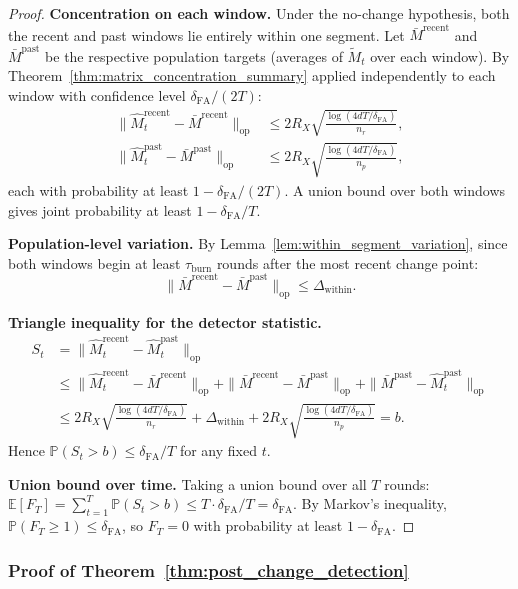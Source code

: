 \documentclass{article}
\newcommand{\E}{\mathbb{E}}
\newcommand{\Prob}{\mathbb{P}}
\newcommand{\op}{\mathrm{op}}
\begin{document}
\begin{proof}
\textbf{Concentration on each window.}
Under the no-change hypothesis, both the recent and past windows lie entirely within one segment.  Let $\bar M^{\mathrm{recent}}$ and $\bar M^{\mathrm{past}}$ be the respective population targets (averages of $\widetilde M_t$ over each window).  By Theorem~\ref{thm:matrix_concentration_summary} applied independently to each window with confidence level $\delta_{\mathrm{FA}}/(2T)$:
\begin{align*}
\|\widehat M_t^{\mathrm{recent}} - \bar M^{\mathrm{recent}}\|_{\op} &\le 2R_X\sqrt{\frac{\log(4dT/\delta_{\mathrm{FA}})}{n_r}}, \\
\|\widehat M_t^{\mathrm{past}} - \bar M^{\mathrm{past}}\|_{\op} &\le 2R_X\sqrt{\frac{\log(4dT/\delta_{\mathrm{FA}})}{n_p}},
\end{align*}
each with probability at least $1 - \delta_{\mathrm{FA}}/(2T)$.  A union bound over both windows gives joint probability at least $1 - \delta_{\mathrm{FA}}/T$.

\textbf{Population-level variation.}
By Lemma~\ref{lem:within_segment_variation}, since both windows begin at least $\tau_{\mathrm{burn}}$ rounds after the most recent change point:
\[
\|\bar M^{\mathrm{recent}} - \bar M^{\mathrm{past}}\|_{\op} \le \Delta_{\mathrm{within}}.
\]

\textbf{Triangle inequality for the detector statistic.}
\begin{align*}
S_t &= \|\widehat M_t^{\mathrm{recent}} - \widehat M_t^{\mathrm{past}}\|_{\op} \\
&\le \|\widehat M_t^{\mathrm{recent}} - \bar M^{\mathrm{recent}}\|_{\op} + \|\bar M^{\mathrm{recent}} - \bar M^{\mathrm{past}}\|_{\op} + \|\bar M^{\mathrm{past}} - \widehat M_t^{\mathrm{past}}\|_{\op} \\
&\le 2R_X\sqrt{\frac{\log(4dT/\delta_{\mathrm{FA}})}{n_r}} + \Delta_{\mathrm{within}} + 2R_X\sqrt{\frac{\log(4dT/\delta_{\mathrm{FA}})}{n_p}} = b.
\end{align*}
Hence $\Prob(S_t > b) \le \delta_{\mathrm{FA}}/T$ for any fixed $t$.

\textbf{Union bound over time.}
Taking a union bound over all $T$ rounds:
$\E[F_T] = \sum_{t=1}^T \Prob(S_t > b) \le T \cdot \delta_{\mathrm{FA}}/T = \delta_{\mathrm{FA}}$.
By Markov's inequality, $\Prob(F_T \ge 1) \le \delta_{\mathrm{FA}}$, so $F_T = 0$ with probability at least $1 - \delta_{\mathrm{FA}}$.
\end{proof}

\subsubsection{Proof of Theorem~\ref{thm:post_change_detection}}
\label{proof:post_change_detection}
\end{document}
